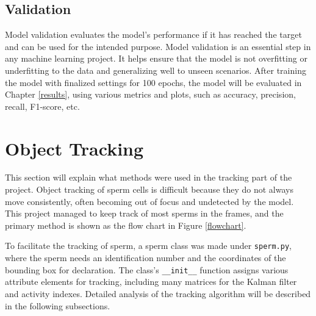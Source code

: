 \subsection{Validation}
Model validation evaluates the model's performance if it has reached the target and can be used for the intended purpose. Model validation is an essential step in any machine learning project. It helps ensure that the model is not overfitting or underfitting to the data and generalizing well to unseen scenarios. After training the model with finalized settings for 100 epochs, the model will be evaluated in Chapter \ref{results}, using various metrics and plots, such as accuracy, precision, recall, F1-score, etc.

\newpage
\section{Object Tracking}
This section will explain what methods were used in the tracking part of the project. Object tracking of sperm cells is difficult because they do not always move consistently, often becoming out of focus and undetected by the model. This project managed to keep track of most sperms in the frames, and the primary method is shown as the flow chart in Figure \ref{flowchart}.

To facilitate the tracking of sperm, a sperm class was made under \verb|sperm.py|, where the sperm needs an identification number and the coordinates of the bounding box for declaration. The class's \verb|__init__| function assigns various attribute elements for tracking, including many matrices for the Kalman filter and activity indexes. Detailed analysis of the tracking algorithm will be described in the following subsections. 

